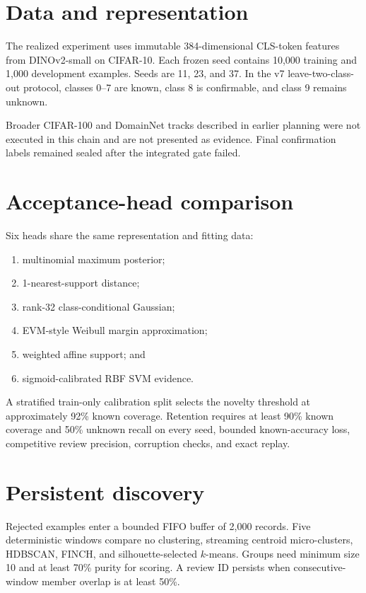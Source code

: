 \documentclass[12pt,oneside]{report}
\begin{document}
\section{Data and representation}

The realized experiment uses immutable 384-dimensional CLS-token features from
DINOv2-small \cite{oquab2024} on CIFAR-10. Each frozen seed contains 10,000
training and 1,000 development examples. Seeds are 11, 23, and 37. In the v7
leave-two-class-out protocol, classes 0--7 are known, class 8 is confirmable,
and class 9 remains unknown.

Broader CIFAR-100 and DomainNet tracks described in earlier planning were not
executed in this chain and are not presented as evidence. Final confirmation
labels remained sealed after the integrated gate failed.

\section{Acceptance-head comparison}

Six heads share the same representation and fitting data:

\begin{enumerate}
\item multinomial maximum posterior;
\item 1-nearest-support distance;
\item rank-32 class-conditional Gaussian;
\item EVM-style Weibull margin approximation;
\item weighted affine support; and
\item sigmoid-calibrated RBF SVM evidence.
\end{enumerate}

A stratified train-only calibration split selects the novelty threshold at
approximately 92\% known coverage. Retention requires at least 90\% known
coverage and 50\% unknown recall on every seed, bounded known-accuracy loss,
competitive review precision, corruption checks, and exact replay.

\section{Persistent discovery}

Rejected examples enter a bounded FIFO buffer of 2,000 records. Five
deterministic windows compare no clustering, streaming centroid
micro-clusters, HDBSCAN, FINCH, and silhouette-selected $k$-means. Groups need
minimum size 10 and at least 70\% purity for scoring. A review ID persists when
consecutive-window member overlap is at least 50\%.
\end{document}
